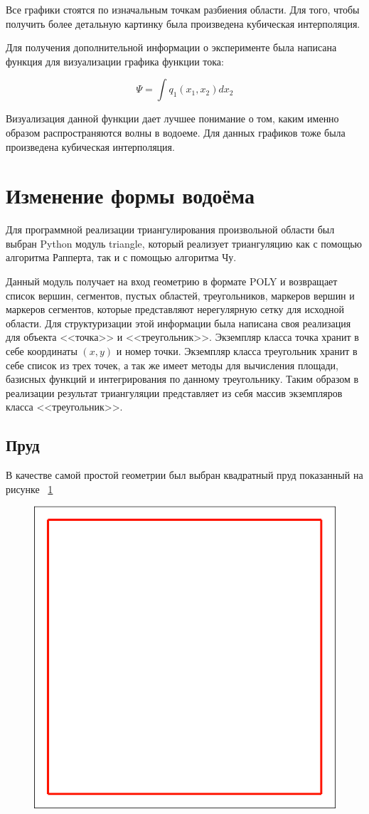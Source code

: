 \documentclass[14pt]{extreport}
\begin{document}
Все графики стоятся по изначальным точкам разбиения области. Для того, чтобы получить более детальную картинку была произведена кубическая интерполяция.

Для получения дополнительной информации о эксперименте была написана функция для визуализации графика функции тока:

$$\Psi = \int q_1(x_1, x_2) dx_2$$

Визуализация данной функции дает лучшее понимание о том, каким именно образом распространяются волны в водоеме. Для данных графиков тоже была произведена кубическая интерполяция.

\section{Изменение формы водоёма}

Для программной реализации триангулирования произвольной области был выбран Python модуль triangle\cite{bib:website:quake:triangle}, который реализует триангуляцию как с помощью алгоритма Рапперта, так и с помощью алгоритма Чу.

Данный модуль получает на вход геометрию в формате POLY и возвращает список вершин, сегментов, пустых областей, треугольников, маркеров вершин и маркеров сегментов, которые представляют нерегулярную сетку для исходной области. Для структуризации этой информации была написана своя реализация для объекта <<точка>> и <<треугольник>>. Экземпляр класса точка хранит в себе координаты $(x, y)$ и номер точки. Экземпляр класса треугольник хранит в себе список из трех точек, а так же имеет методы для вычисления площади, базисных функций и интегрирования по данному треугольнику. Таким образом в реализации результат триангуляции представляет из себя массив экземпляров класса <<треугольник>>.

\subsection{Пруд}

В качестве самой простой геометрии был выбран квадратный пруд  показанный на рисунке ~\ref{img:ex1:contour}

\begin{figure}[H]
\centerline{
\includegraphics[width=0.5\linewidth]{images/ex1/contour}}
\caption{}
\label{img:ex1:contour}
\end{figure}
\end{document}
